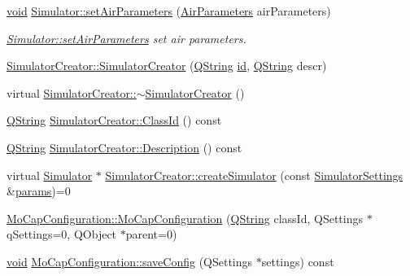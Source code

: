 \begin{DoxyCompactItemize}
\hyperlink{group___u_a_v_objects_plugin_ga444cf2ff3f0ecbe028adce838d373f5c}{void} \hyperlink{group___h_i_t_l_plugin_ga2425318c670bb0ddcba4dcf35f891bee}{Simulator\-::set\-Air\-Parameters} (\hyperlink{struct_air_parameters}{Air\-Parameters} air\-Parameters)
\begin{DoxyCompactList}\small\item\em \hyperlink{group___h_i_t_l_plugin_ga2425318c670bb0ddcba4dcf35f891bee}{Simulator\-::set\-Air\-Parameters} set air parameters. \end{DoxyCompactList}\item 
\hyperlink{group___h_i_t_l_plugin_gad78ac7b6a64456e259fcb9aba94f4947}{Simulator\-Creator\-::\-Simulator\-Creator} (\hyperlink{group___u_a_v_objects_plugin_gab9d252f49c333c94a72f97ce3105a32d}{Q\-String} \hyperlink{glext_8h_a58c2a664503e14ffb8f21012aabff3e9}{id}, \hyperlink{group___u_a_v_objects_plugin_gab9d252f49c333c94a72f97ce3105a32d}{Q\-String} descr)
\item 
virtual \hyperlink{group___h_i_t_l_plugin_ga07d44da289771bf1bc8cf9dd01d5cb13}{Simulator\-Creator\-::$\sim$\-Simulator\-Creator} ()
\item 
\hyperlink{group___u_a_v_objects_plugin_gab9d252f49c333c94a72f97ce3105a32d}{Q\-String} \hyperlink{group___h_i_t_l_plugin_ga4195682a513bc0ddf6818ff4058d2619}{Simulator\-Creator\-::\-Class\-Id} () const 
\item 
\hyperlink{group___u_a_v_objects_plugin_gab9d252f49c333c94a72f97ce3105a32d}{Q\-String} \hyperlink{group___h_i_t_l_plugin_ga1ace675dc4a400f644b7e6f7506f65e9}{Simulator\-Creator\-::\-Description} () const 
\item 
virtual \hyperlink{class_simulator}{Simulator} $\ast$ \hyperlink{group___h_i_t_l_plugin_ga2511a02773cadaf9c503a89172622837}{Simulator\-Creator\-::create\-Simulator} (const \hyperlink{group___h_i_t_l_plugin_ga052199f1328d3002bce3e45345aa7f4e}{Simulator\-Settings} \&\hyperlink{glext_8h_afeb6390ab3bc8a0e96a88aff34d52288}{params})=0
\item 
\hyperlink{group___h_i_t_l_plugin_ga98e918c3063a6ec66da51a9532174cc8}{Mo\-Cap\-Configuration\-::\-Mo\-Cap\-Configuration} (\hyperlink{group___u_a_v_objects_plugin_gab9d252f49c333c94a72f97ce3105a32d}{Q\-String} class\-Id, Q\-Settings $\ast$q\-Settings=0, Q\-Object $\ast$parent=0)
\item 
\hyperlink{group___u_a_v_objects_plugin_ga444cf2ff3f0ecbe028adce838d373f5c}{void} \hyperlink{group___h_i_t_l_plugin_ga4890815d185a0393db178dd686be0bdb}{Mo\-Cap\-Configuration\-::save\-Config} (Q\-Settings $\ast$settings) const 

\end{DoxyCompactItemize}
